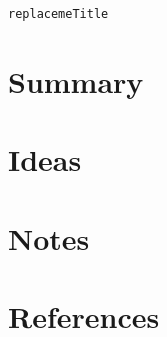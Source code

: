 \documentclass[10pt,numbers=noenddot]{article}
\begin{document}
\begin{flushright}\texttt{replacemeTitle}\end{flushright} \hfill
\lline

\section*{Summary}
\section*{Ideas}
\section*{Notes}
\section*{References}
\end{document}
